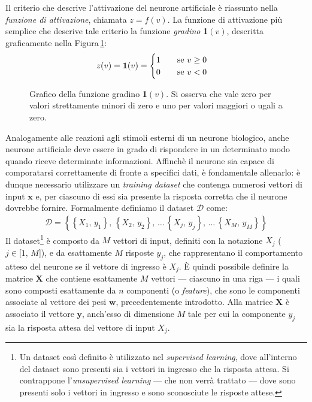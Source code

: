 % 
Il criterio che descrive l'attivazione del neurone artificiale è riassunto nella \textsl{funzione di attivazione}, chiamata $z = f(v)$. La funzione di attivazione più semplice che descrive tale criterio la funzione \textsl{gradino} \textbf{1}$(v)$, descritta graficamente nella Figura\,\ref{fig:step-function}:
% 
\begin{gather*}
    z(v) = \text{\textbf{1}}(v) =
    \begin{cases}
        1 \hspace{20px} \text{se } v\geq0\\
        0 \hspace{20px} \text{se } v<0
    \end{cases}
\end{gather*}
% 
\begin{figure}[!b]
    \centering
    
    \caption[Grafico della funzione gradino \textsl{1}$(v)$.]{Grafico della funzione gradino \textbf{1}$(v)$. Si osserva che vale zero per valori strettamente minori di zero e uno per valori maggiori o ugali a zero.}\label{fig:step-function}
\end{figure}
% 
\noindent Analogamente alle reazioni agli stimoli esterni di un neurone biologico, anche neurone artificiale deve essere in grado di rispondere in un determinato modo quando riceve determinate informazioni. Affinchè il neurone sia capace di comporatarsi correttamente di fronte a specifici dati, è fondamentale allenarlo: è dunque necessario utilizzare un \textit{training dataset} che contenga numerosi vettori di input $\mathbf{x}$ e, per ciascuno di essi sia presente la risposta corretta che il neurone dovrebbe fornire. Formalmente definiamo il dataset $\mathcal{D}$ come:
% 
\begin{gather*}
    \mathcal{D} = \left\{ \left\{ X_1,\, y_1 \right\},\,\left\{ X_2,\, y_2 \right\},\,\dots\,\left\{ X_j,\, y_j \right\},\,\dots\,\left\{ X_M,\, y_M \right\} \right\}  
\end{gather*}
% 
\noindent Il dataset\footnote{Un dataset così definito è utilizzato nel \textit{supervised learning}, dove all'interno del dataset sono presenti sia i vettori in ingresso che la risposta attesa. Si contrappone l'\textit{unsupervised learning} — che non verrà trattato — dove sono presenti solo i vettori in ingresso e sono sconosciute le risposte attese.} è composto da $M$ vettori di input, definiti con la notazione $X_j$ ($j\in[1,\,M$]), e da esattamente $M$ risposte $y_j$, che rappresentano il comportamento atteso del neurone se il vettore di ingresso è $X_j$. È quindi possibile definire la matrice $\mathbf{X}$ che contiene esattamente $M$ vettori — ciascuno in una riga — i quali sono composti esattamente da $n$ componenti (o \textit{feature}), che sono le componenti associate al vettore dei pesi $\mathbf{w}$, precedentemente introdotto. Alla matrice $\mathbf{X}$ è associato il vettore $\mathbf{y}$, anch'esso di dimensione $M$ tale per cui la componente $y_j$ sia la risposta attesa del vettore di input $X_j$.
